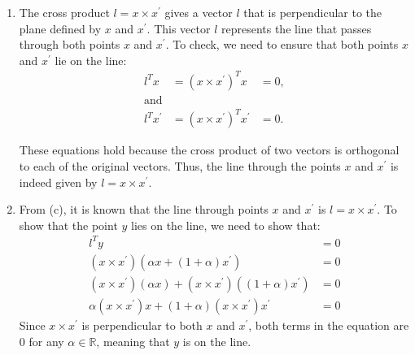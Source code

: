 \documentclass[11pt,a4paper]{article}
\begin{document}
\begin{enumerate}
\begin{enumerate}
                  \item The cross product $l=x \times x^\prime$ gives a vector $l$ that is perpendicular to the plane
                        defined by $x$ and $x^\prime$. This vector $l$ represents the line that passes through both points $x$ and $x^\prime$.
                        To check, we need to ensure that both points $x$ and $x^\prime$ lie on the line:
                        \begin{align*}
                              l^T x        & = (x \times x^\prime)^T x        & = 0, \\
                              \text{and}                                             \\
                              l^T x^\prime & = (x \times x^\prime)^T x^\prime & = 0.
                        \end{align*}

                        These equations hold because the cross product of two vectors is orthogonal to each of the original vectors.
                        Thus, the line through the points $x$ and $x^\prime$ is indeed given by $l = x \times x^\prime$.

                  \item From (c), it is known that the line through points $x$ and $x^\prime$ is $l = x \times x^\prime$.
                        To show that the point $y$ lies on the line, we need to show that:
                        \begin{align*}
                              l^T y                                                                     & = 0 \\
                              (x \times x^\prime)(\alpha x + (1 + \alpha)x^\prime)                      & = 0 \\
                              (x \times x^\prime)(\alpha x) + (x \times x^\prime)((1 + \alpha)x^\prime) & = 0 \\
                              \alpha(x \times x^\prime)x + (1 + \alpha)(x \times x^\prime)x^\prime      & = 0
                        \end{align*}
                        Since $x \times x^\prime$ is perpendicular to both $x$ and $x^\prime$, both terms in the equation
                        are 0 for any $\alpha \in \mathbb{R}$, meaning that $y$ is on the line.
            \end{enumerate}

            \newpage


\end{enumerate}
\end{document}
